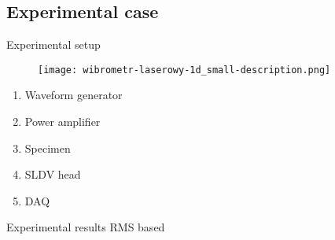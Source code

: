 \documentclass[10pt,aspectratio=169,dvipsnames]{beamer} %
\begin{document}
\subsection{Experimental case}
\setcounter{subfigure}{0}
\begin{frame}{Experimental setup}
	\begin{minipage}[t]{0.55\textwidth}
		\begin{figure}
			\centering
			\texttt{[image: wibrometr-laserowy-1d\_small-description.png]}
		\end{figure}
	\end{minipage}
	\begin{minipage}[t]{0.4\textwidth}
		\begin{enumerate}
			\item Waveform generator
			\item Power amplifier	
			\item Specimen
			\item SLDV head
			\item DAQ
		\end{enumerate}
	\end{minipage}
\end{frame}

\setcounter{subfigure}{0}
\begin{frame}{Experimental results RMS based}
	\centering
	\begin{figure}
		\qquad
		\qquad
		\qquad
		\\
		\qquad
		\qquad
	\end{figure}
\end{frame}
\end{document}
